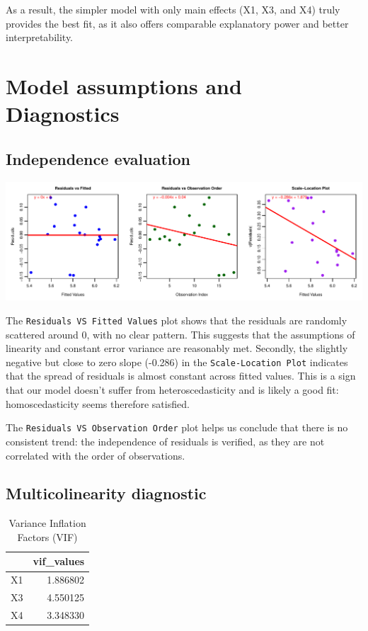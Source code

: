 \documentclass[
  11pt,
]{article}
\begin{document}
As a result, the simpler model with only main effects (X1, X3, and X4)
truly provides the best fit, as it also offers comparable explanatory
power and better interpretability.

\section{Model assumptions and
Diagnostics}\label{model-assumptions-and-diagnostics}

\subsection{Independence evaluation}\label{independence-evaluation}

\includegraphics{Figs/unnamed-chunk-13-1.pdf}

The \texttt{Residuals\ VS\ Fitted\ Values} plot shows that the residuals
are randomly scattered around 0, with no clear pattern. This suggests
that the assumptions of linearity and constant error variance are
reasonably met. Secondly, the slightly negative but close to zero slope
(-0.286) in the \texttt{Scale-Location\ Plot} indicates that the spread
of residuals is almost constant across fitted values. This is a sign
that our model doesn't suffer from heteroscedasticity and is likely a
good fit: homoscedasticity seems therefore satisfied.

The \texttt{Residuals\ VS\ Observation\ Order} plot helps us conclude
that there is no consistent trend: the independence of residuals is
verified, as they are not correlated with the order of observations.

\subsection{Multicolinearity
diagnostic}\label{multicolinearity-diagnostic}

\begingroup\fontsize{8}{10}\selectfont

\begin{longtable}[t]{lr}
\caption{\label{tab:unnamed-chunk-14}Variance Inflation Factors (VIF)}\\
\toprule
 & vif\_values\\
\midrule
X1 & 1.886802\\
X3 & 4.550125\\
X4 & 3.348330\\
\bottomrule
\end{longtable}
\endgroup{}
\end{document}
